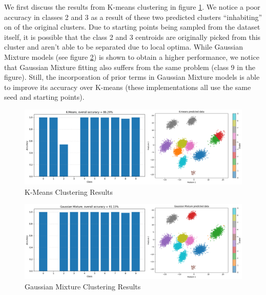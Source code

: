 We first discuss the results from K-means clustering in figure \ref{fig:kmeans}. We notice a poor accuracy in classes 2 and 3 as a result of these two predicted clusters ``inhabiting'' on of the original clusters. Due to starting points being sampled from the dataset itself, it is possible that the class 2 and 3 centroids are originally picked from this cluster and aren't able to be separated due to local optima. While Gaussian Mixture models (see figure \ref{fig:gmm}) is shown to obtain a higher performance, we notice that Gaussian Mixture fitting also suffers from the same problem (class 9 in the figure). Still, the incorporation of prior terms in Gaussian Mixture models is able to improve its accuracy over K-means (these implementations all use the same seed and starting points).

\begin{figure}[h]
    \centering
    \includegraphics[width=0.9\linewidth]{figures/result-kmeans.png}
    \caption{K-Means Clustering Results}
    \label{fig:kmeans}
\end{figure}

\begin{figure}[h]
    \centering
    \includegraphics[width=0.9\linewidth]{figures/result-gmm.png}
    \caption{Gaussian Mixture Clustering Results}
    \label{fig:gmm}
\end{figure}